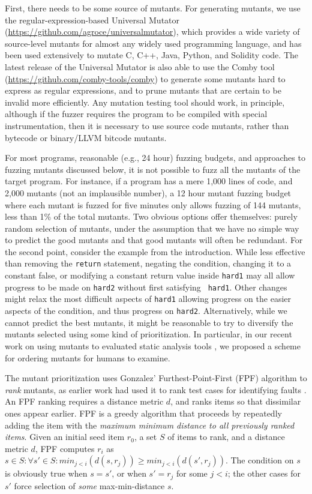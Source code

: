 First, there needs to be some source of mutants.  For generating
mutants, we use the regular-expression-based Universal Mutator
\cite{regexpMut} (\url{https://github.com/agroce/universalmutator}),
which provides a wide variety of source-level mutants for almost any
widely used programming language, and has been used extensively to
mutate C, C++, Java, Python, and Solidity code.  The latest release of
the Universal Mutator is also able to use the Comby \cite{combypaper}
tool (\url{https://github.com/comby-tools/comby}) to generate some
mutants hard to express as regular expressions, and to prune mutants
that are certain to be invalid more efficiently.  Any mutation testing
tool should work, in principle, although if the fuzzer requires the
program to be compiled with special instrumentation, then it is
necessary to use source code mutants, rather than bytecode or
binary/LLVM bitcode mutants.

For most programs, reasonable (e.g., 24 hour) fuzzing budgets, and
approaches to fuzzing mutants discussed below, it is not possible to
fuzz all the mutants of the target program.  For instance, if a
program has a mere 1,000 lines of code, and 2,000 mutants (not an
implausible number), a 12 hour mutant fuzzing budget where each mutant
is fuzzed for five minutes only allows fuzzing of 144 mutants, less
than 1\% of the total mutants.  Two obvious options offer themselves:
purely random selection of mutants, under the assumption that we have
no simple way to predict the good mutants and that good mutants will
often be redundant.  For the second point, consider the example from
the introduction.  While less effective than removing the {\tt return}
statement, negating the condition, changing it to a constant false, or
modifying a constant return value inside {\tt hard1} may all allow
progress to be made on {\tt hard2} without first satisfying {\tt
  hard1}.  Other changes might relax the most difficult aspects of
{\tt hard1} allowing progress on the easier aspects of the condition,
and thus progress on {\tt hard2}.  Alternatively, while we cannot
predict the best mutants, it might be reasonable to try to diversify
the mutants selected using some kind of prioritization.  In
particular, in our recent work on using mutants to evaluated static
analysis tools \cite{QRS2021}, we proposed a scheme for ordering
mutants for humans to examine.  

The mutant prioritization
uses Gonzalez' Furthest-Point-First \cite{Gonzalez} (FPF) algorithm
to \emph{rank} mutants, as earlier work had used it to rank test cases for identifying faults \cite{PLDI13}.
An
FPF ranking requires a distance metric $d$, and ranks items so that
dissimilar ones appear earlier.  FPF is a
greedy algorithm that proceeds by repeatedly adding the item with the
\emph{maximum minimum distance to all previously ranked items}. Given an
initial seed item $r_0$, a set $S$ of items to rank, and a distance
metric $d$, FPF computes $r_i$ as
$s \in S: \forall s' \in S: min_{ j < i}(d(s,r_j)) \geq min_{j <
  i}(d(s',r_j))$.  The condition on $s$ is obviously true when
$s = s'$, or when $s' = r_j$ for some $j < i$; the other cases for
$s'$ force selection of \emph{some}
max-min-distance $s$.


